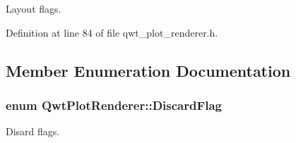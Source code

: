 Layout flags. 



Definition at line 84 of file qwt\-\_\-plot\-\_\-renderer.\-h.



\subsection{Member Enumeration Documentation}
\hypertarget{class_qwt_plot_renderer_a34d2aa9911e93cb7871e6ce4210e41cd}{
\subsubsection[{Discard\-Flag}]{\setlength{\rightskip}{0pt plus 5cm}enum {\bf Qwt\-Plot\-Renderer\-::\-Discard\-Flag}}}\label{class_qwt_plot_renderer_a34d2aa9911e93cb7871e6ce4210e41cd}


Disard flags. 


